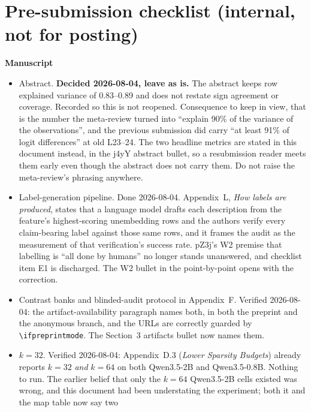 \documentclass[11pt]{article}
\newif\ifdraftnotes
\begin{document}
\ifdraftnotes
\clearpage
{\color{red}
\section*{Pre-submission checklist (internal, not for posting)}

\textbf{Manuscript}
\begin{itemize}[label=$\square$]
\item[$\boxtimes$] Abstract. \textbf{Decided 2026-08-04, leave as is.} The
abstract keeps row explained variance of 0.83--0.89 and does not restate sign
agreement or coverage. Recorded so this is not reopened. Consequence to keep
in view, that is the number the meta-review turned into ``explain 90\% of the
variance of the observations'', and the previous submission did carry ``at
least 91\% of logit differences'' at old L23--24. The two headline metrics
are stated in this document instead, in the j4yY abstract bullet, so a
resubmission reader meets them early even though the abstract does not carry
them. Do not raise the meta-review's phrasing anywhere.
\item[$\boxtimes$] Label-generation pipeline. Done 2026-08-04. Appendix~L,
\emph{How labels are produced}, states that a language model drafts each
description from the feature's highest-scoring unembedding rows and the
authors verify every claim-bearing label against those same rows, and it
frames the audit as the measurement of that verification's success rate.
pZ3j's W2 premise that labelling is ``all done by humans'' no longer stands
unanswered, and checklist item E1 is discharged. The W2 bullet in the
point-by-point opens with the correction.
\item[$\boxtimes$] Contrast banks and blinded-audit protocol in Appendix~F.
Verified 2026-08-04: the artifact-availability paragraph names both, in both
the preprint and the anonymous branch, and the URLs are correctly guarded by
\texttt{\textbackslash ifpreprintmode}. The Section~3 artifacts bullet now
names them.
\item[$\boxtimes$] $k=32$. Verified 2026-08-04: Appendix~D.3
(\emph{Lower Sparsity Budgets}) already reports $k=32$ \emph{and} $k=64$ on
both Qwen3.5-2B and Qwen3.5-0.8B. Nothing to run. The earlier belief that
only the $k=64$ Qwen3.5-2B cells existed was wrong, and this document had
been understating the experiment; both it and the map table now say two

\end{itemize}}
\end{document}
